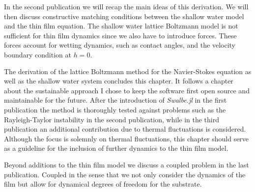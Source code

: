 In the second publication we will recap the main ideas of this derivation. 
We will then discuss constructive matching conditions between the shallow water model and the thin film equation.
The shallow water lattice Boltzmann model is not sufficient for thin film dynamics since we also have to introduce forces. 
These forces account for wetting dynamics, such as contact angles, and the velocity boundary condition at $h = 0$.

The derivation of the lattice Boltzmann method for the Navier-Stokes equation as well as the shallow water system concludes this chapter.
It follows a chapter about the sustainable approach I chose to keep the software first open source and maintainable for the future.
After the introduction of \textit{Swalbe.jl} in the first publication the method is thoroughly tested against problems such as the Rayleigh-Taylor instability in the second publication, while in the third publication an additional contribution due to thermal fluctuations is considered. 
Although the focus is solemnly on thermal fluctuations, this chapter should serve as a guideline for the inclusion of further dynamics to the thin film model.

Beyond additions to the thin film model we discuss a coupled problem in the last publication. 
Coupled in the sense that we not only consider the dynamics of the film but allow for dynamical degrees of freedom for the substrate.